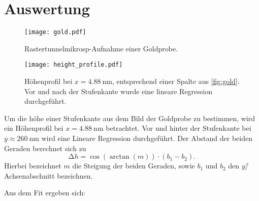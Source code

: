 \section{Auswertung}
\label{sec:Auswertung}

\begin{figure}
  \centering
  \texttt{[image: gold.pdf]}
  \caption{Rastertunnelmikrosp-Aufnahme einer Goldprobe.}
  \label{fig:gold}
\end{figure}


\begin{figure}
  \centering
  \texttt{[image: height\_profile.pdf]}
  \caption{Höhenprofil bei $x=\SI{4.88}{\nano\meter}$, entsprechend einer Spalte aus \autoref{fig:gold}. Vor und nach der Stufenkante wurde eine lineare Regression durchgeführt.}
  \label{fig:profile}
\end{figure}

Um die höhe einer Stufenkante aus dem Bild der Goldprobe zu bestimmen, wird ein Höhenprofil bei $x=\SI{4.88}{\nano\meter}$ betrachtet.
Vor und hinter der Stufenkante bei  $y \approx \SI{260}{\nano\meter}$ wird eine Lineare Regression durchgeführt.
Der Abstand der beiden Geraden berechnet sich zu
\begin{equation}
  \increment h = \cos(\arctan(m)) \cdot (b_1 - b_2).
\end{equation}
Hierbei bezeichnet $m$ die Steigung der beiden Geraden, sowie $b_1$ und $b_2$ den $y$\=/Achsenabschnitt bezeichnen.

Aus dem Fit ergeben sich:

